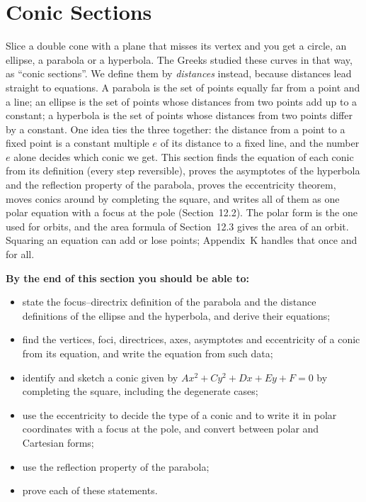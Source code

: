 \documentclass[11pt]{article}
\begin{document}
\section{Conic Sections}

\begin{guide}
Slice a double cone with a plane that misses its vertex and you get a circle, an ellipse, a parabola or a hyperbola. The Greeks studied these curves in that way, as ``conic sections''. We define them by \emph{distances} instead, because distances lead straight to equations. A parabola is the set of points equally far from a point and a line; an ellipse is the set of points whose distances from two points add up to a constant; a hyperbola is the set of points whose distances from two points differ by a constant. One idea ties the three together: the distance from a point to a fixed point is a constant multiple $e$ of its distance to a fixed line, and the number $e$ alone decides which conic we get. This section finds the equation of each conic from its definition (every step reversible), proves the asymptotes of the hyperbola and the reflection property of the parabola, proves the eccentricity theorem, moves conics around by completing the square, and writes all of them as one polar equation with a focus at the pole (Section~12.2). The polar form is the one used for orbits, and the area formula of Section~12.3 gives the area of an orbit. Squaring an equation can add or lose points; Appendix~K handles that once and for all.
\end{guide}

\textbf{By the end of this section you should be able to:}
\begin{itemize}
  \item state the focus--directrix definition of the parabola and the distance definitions of the ellipse and the hyperbola, and derive their equations;
  \item find the vertices, foci, directrices, axes, asymptotes and eccentricity of a conic from its equation, and write the equation from such data;
  \item identify and sketch a conic given by $Ax^2+Cy^2+Dx+Ey+F=0$ by completing the square, including the degenerate cases;
  \item use the eccentricity to decide the type of a conic and to write it in polar coordinates with a focus at the pole, and convert between polar and Cartesian forms;
  \item use the reflection property of the parabola;
  \item prove each of these statements.
\end{itemize}
\end{document}
